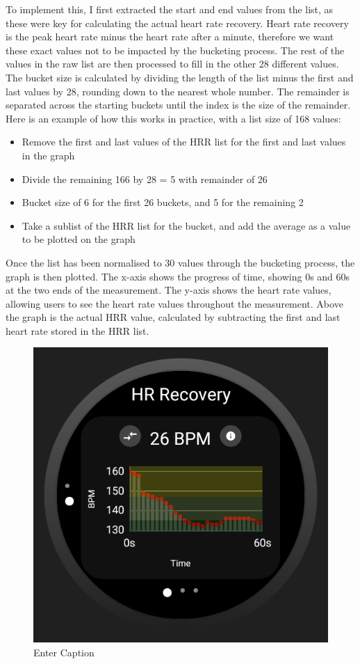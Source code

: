 \documentclass{l4proj}
\begin{document}
To implement this, I first extracted the start and end values from the list, as these were key for calculating the actual heart rate recovery. Heart rate recovery is the peak heart rate minus the heart rate after a minute, therefore we want these exact values not to be impacted by the bucketing process. The rest of the values in the raw list are then processed to fill in the other 28 different values. The bucket size is calculated by dividing the length of the list minus the first and last values by 28, rounding down to the nearest whole number. The remainder is separated across the starting buckets until the index is the size of the remainder. Here is an example of how this works in practice, with a list size of 168 values:

\begin{itemize}
    \item Remove the first and last values of the HRR list for the first and last values in the graph
    \item Divide the remaining 166 by 28 = 5 with remainder of 26
    \item Bucket size of 6 for the first 26 buckets, and 5 for the remaining 2
    \item Take a sublist of the HRR list for the bucket, and add the average as a value to be plotted on the graph
\end{itemize}

Once the list has been normalised to 30 values through the bucketing process, the graph is then plotted. The x-axis shows the progress of time, showing 0s and 60s at the two ends of the measurement. The y-axis shows the heart rate values, allowing users to see the heart rate values throughout the measurement. Above the graph is the actual HRR value, calculated by subtracting the first and last heart rate stored in the HRR list.

\begin{figure}[h]
    \centering
    \includegraphics[width=0.5\linewidth]{dissertation//dissImages/HRRGraph.png}
    \caption{Enter Caption}
    \label{fig:enter-label}
\end{figure}
\end{document}
